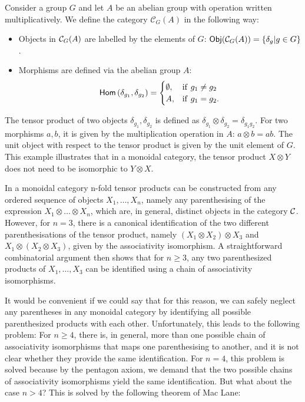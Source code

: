 \begin{exmp}
	Consider a group $G$ and let $A$ be an abelian group with operation written multiplicatively. We define the category  $\mathcal{C}_G(A)$ in the following way:
		\begin{itemize}
			\item Objects in ${\mathcal{C}}_G(A)$ are labelled by the elements of $G$: $\mathsf{Obj}({\mathcal{C}}_G(A))=\{\delta_g|g\in G\}$.
			\item Morphisms are defined via the abelian group $A$:
					\begin{equation}
						\mathsf{Hom}\left(\delta_{g_1},\delta_{g_2}\right)=\begin{cases}
							\emptyset, & \mathrm{if\ } g_1\neq g_2\\
							A, & \mathrm{if\ } g_1= g_2.
						\end{cases}
					\end{equation}
		\end{itemize}
	The tensor product of two objects $\delta_{g_1},\delta_{g_2}$ is defined as $\delta_{g_1}\otimes\delta_{g_2}=\delta_{g_1g_2}$. For two morphisms $a,b$, it is given by the multiplication operation in $A$: $a\otimes b=ab$. The unit object with respect to the tensor product is given by the unit element of $G$. This example illustrates that in a monoidal category, the tensor product $X\otimes Y$ does not need to be isomorphic to $Y\otimes X$.
\end{exmp}

In a monoidal category n-fold tensor products can be constructed from any ordered sequence of objects $X_1,\dots,X_n$, namely any parenthesising of the expression $X_1\otimes\dots\otimes X_n$, which are, in general, distinct objects in the category ${\mathcal{C}}$. However, for $n=3$, there is a canonical identification of the two different parenthesisations of the tensor product, namely $(X_1\otimes X_2)\otimes X_3$ and $X_1\otimes (X_2\otimes X_3)$, given by the associativity isomorphism. A straightforward combinatorial argument then shows that for $n\ge 3$, any two parenthesized products of $X_1,\dots,X_3$ can be identified using a chain of associativity isomorphisms.

It would be convenient if we could say that for this reason, we can safely neglect any parentheses in any monoidal category by identifying all possible parenthesized products with each other. Unfortunately, this leads to the following problem: For $n\ge 4$, there is, in general, more than one possible chain of associativity isomorphisms that maps one parenthesising to another, and it is not clear whether they provide the same identification. For $n=4$, this problem is solved because by the pentagon axiom, we demand that the two possible chains of associativity isomorphisms yield the same identification. But what about the case $n>4$? This is solved by the following theorem of Mac Lane:

